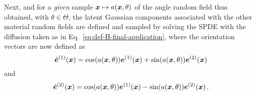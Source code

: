 Next, and for a \textit{given} sample $\boldsymbol{x} \mapsto a(\boldsymbol{x}, \theta)$ of the angle random field thus obtained, with $\theta \in \Theta$, the latent Gaussian components associated with the other material random fields are defined and sampled by solving the SPDE with the diffusion taken as in Eq.~\eqref{eq:def-H-final-application}, where the orientation vectors are now defined as
\begin{equation}    
    \hat{\boldsymbol{e}}^{(1)}(\boldsymbol{x}) = \cos(a(\boldsymbol{x}, \theta)) \boldsymbol{e}^{(1)}(\boldsymbol{x}) + \sin(a(\boldsymbol{x}, \theta))\boldsymbol{e}^{(2)}(\boldsymbol{x})
\end{equation}
and
\begin{equation}    
 \hat{\boldsymbol{e}}^{(2)}(\boldsymbol{x}) = \cos(a(\boldsymbol{x}, \theta)) \boldsymbol{e}^{(1)}(\boldsymbol{x}) - \sin(a(\boldsymbol{x}, \theta))\boldsymbol{e}^{(2)}(\boldsymbol{x})\,.
\end{equation}

